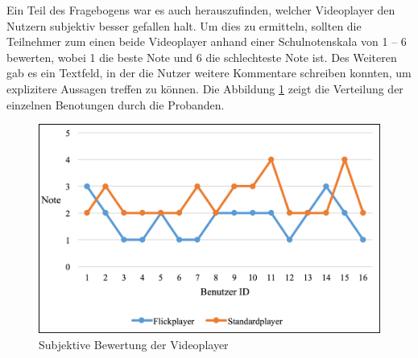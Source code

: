 \documentclass[11pt,a4paper]{report}
\begin{document}
Ein Teil des Fragebogens war es auch herauszufinden, welcher Videoplayer den Nutzern subjektiv besser gefallen halt. Um dies zu ermitteln, sollten die Teilnehmer zum einen beide Videoplayer anhand einer Schulnotenskala von 1 – 6 bewerten, wobei 1 die beste Note und 6 die schlechteste Note ist. Des Weiteren gab es ein Textfeld, in der die Nutzer weitere Kommentare schreiben konnten, um explizitere Aussagen treffen zu können. Die Abbildung \ref{benotung} zeigt die Verteilung der einzelnen Benotungen durch die Probanden.
\begin{figure}[h]
\begin{center}
\includegraphics[scale=0.9]{./images/38.png}
\caption{Subjektive Bewertung der Videoplayer}
\label{benotung}
\end{center}
\end{figure}
\end{document}
